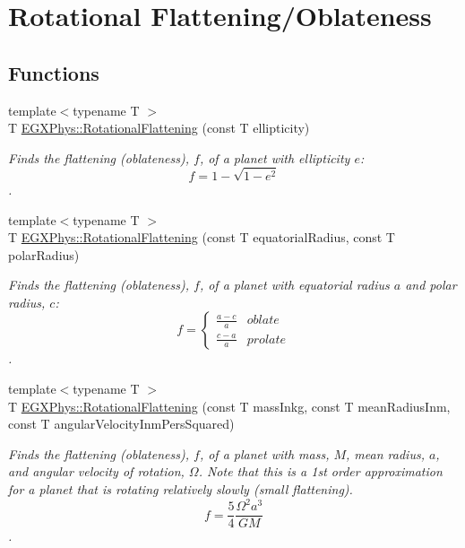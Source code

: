 \hypertarget{group___e_g_x_phys-_astrophysics-_rotational_flattening}{}\section{Rotational Flattening/\+Oblateness}
\label{group___e_g_x_phys-_astrophysics-_rotational_flattening}
\subsection*{Functions}
\begin{DoxyCompactItemize}
\item 
{\footnotesize template$<$typename T $>$ }\\T \mbox{\hyperlink{group___e_g_x_phys-_astrophysics-_rotational_flattening_gaa89a23906fe0f4df85463f301825b466}{E\+G\+X\+Phys\+::\+Rotational\+Flattening}} (const T ellipticity)
\begin{DoxyCompactList}\small\item\em Finds the flattening (oblateness), $f$, of a planet with ellipticity $e$\+: \[ f = 1 - \sqrt{1-e^2} \]. \end{DoxyCompactList}\item 
{\footnotesize template$<$typename T $>$ }\\T \mbox{\hyperlink{group___e_g_x_phys-_astrophysics-_rotational_flattening_ga1840fed2081c35f68c4b8bfa75248977}{E\+G\+X\+Phys\+::\+Rotational\+Flattening}} (const T equatorial\+Radius, const T polar\+Radius)
\begin{DoxyCompactList}\small\item\em Finds the flattening (oblateness), $f$, of a planet with equatorial radius $a$ and polar radius, $c$\+: \[ f =\begin{cases} \frac{a-c}{a}{} & oblate \\ \frac{c-a}{a} & prolate \end{cases} \]. \end{DoxyCompactList}\item 
{\footnotesize template$<$typename T $>$ }\\T \mbox{\hyperlink{group___e_g_x_phys-_astrophysics-_rotational_flattening_ga316b9afb6e1aa940fa96417c6f24ed4d}{E\+G\+X\+Phys\+::\+Rotational\+Flattening}} (const T mass\+Inkg, const T mean\+Radius\+Inm, const T angular\+Velocity\+Inm\+Pers\+Squared)
\begin{DoxyCompactList}\small\item\em Finds the flattening (oblateness), $f$, of a planet with mass, $M$, mean radius, $a$, and angular velocity of rotation, $\Omega$. Note that this is a 1st order approximation for a planet that is rotating relatively slowly (small flattening). \[ f = \frac{5}{4} \frac{\Omega^2 a^3}{GM} \]. \end{DoxyCompactList}\item 

\end{DoxyCompactItemize}
